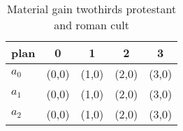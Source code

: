 \documentclass[a4paper]{article}
\begin{document}
\begin{table}
\begin{adjustbox}{width=0.5\columnwidth}
\begin{tabular}{|l|l|l|l|l|}
\hline
\textbf{plan} & \multicolumn{1}{c|}{\textbf{0}} & \multicolumn{1}{c|}{\textbf{1}} & \multicolumn{1}{c|}{\textbf{2}} & \multicolumn{1}{c|}{\textbf{3}} \\ \hline
\textbf{$a_0$}  & (0,0) & (1,0) & (2,0) & (3,0) \\ \hline
\textbf{$a_1$}  & (0,0) & (1,0) & (2,0) & (3,0) \\ \hline
\textbf{$a_2$}  & (0,0) & (1,0) & (2,0) & (3,0) \\ \hline
\end{tabular}
\end{adjustbox}
\caption{Material gain twothirds protestant and roman cult
}
\end{table}
\end{document}
